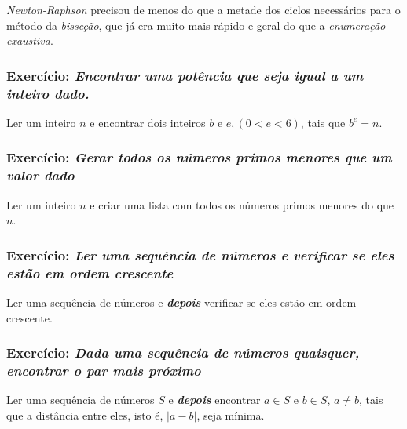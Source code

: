 \documentclass[11pt]{article}
\begin{document}
    \emph{Newton-Raphson} precisou de menos do que a metade dos ciclos
necessários para o método da \emph{bisseção}, que já era muito mais
rápido e geral do que a \emph{enumeração exaustiva}.

    \subsubsection{\texorpdfstring{Exercício: \emph{Encontrar uma potência
que seja igual a um inteiro
dado.}}{Exercício: Encontrar uma potência que seja igual a um inteiro dado.}}\label{exercuxedcio-encontrar-uma-potuxeancia-que-seja-igual-a-um-inteiro-dado.}

Ler um inteiro \(n\) e encontrar dois inteiros \(b\) e
\(e, (0 < e < 6)\), tais que \(b^e = n\).

    \subsubsection{\texorpdfstring{Exercício: \emph{Gerar todos os números
primos menores que um valor
dado}}{Exercício: Gerar todos os números primos menores que um valor dado}}\label{exercuxedcio-gerar-todos-os-nuxfameros-primos-menores-que-um-valor-dado}

Ler um inteiro \(n\) e criar uma lista com todos os números primos
menores do que \(n\).

    \subsubsection{\texorpdfstring{Exercício: \emph{Ler uma sequência de
números e verificar se eles estão em ordem
crescente}}{Exercício: Ler uma sequência de números e verificar se eles estão em ordem crescente}}\label{exercuxedcio-ler-uma-sequuxeancia-de-nuxfameros-e-verificar-se-eles-estuxe3o-em-ordem-crescente}

Ler uma sequência de números e \textbf{\emph{depois}} verificar se eles
estão em ordem crescente.

    \subsubsection{\texorpdfstring{Exercício: \emph{Dada uma sequência de
números quaisquer, encontrar o par mais
próximo}}{Exercício: Dada uma sequência de números quaisquer, encontrar o par mais próximo}}\label{exercuxedcio-dada-uma-sequuxeancia-de-nuxfameros-quaisquer-encontrar-o-par-mais-pruxf3ximo}

Ler uma sequência de números \(S\) e \textbf{\emph{depois}} encontrar
\(a \in S\) e \(b \in S\), \(a \ne b\), tais que a distância entre eles,
isto é, \(\lvert a - b \rvert\), seja mínima.
\end{document}
